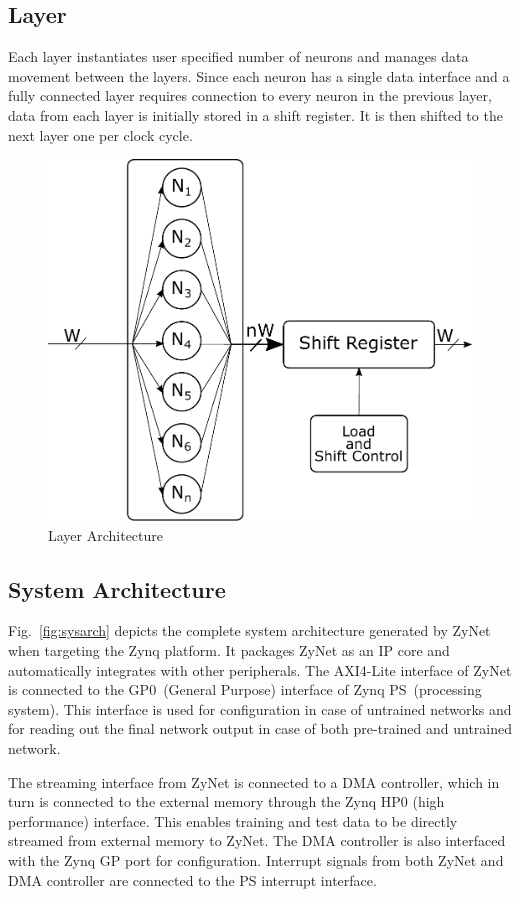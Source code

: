 \subsection{Layer}
Each layer instantiates user specified number of neurons and manages data movement between the layers.
Since each neuron has a single data interface and a fully connected layer requires connection to every neuron in the previous layer, data from each layer is initially stored in a shift register.
It is then shifted to the next layer one per clock cycle.
\begin{figure}[!t]
\centering
   \includegraphics[width=0.8\columnwidth]{Figures/layer.pdf}
   \caption{Layer Architecture}
   \label{fig:arch}
   \vspace{-3mm}
\end{figure}

\subsection{System Architecture}
Fig.~\ref{fig:sysarch} depicts the complete system architecture generated by ZyNet when targeting the Zynq platform.
It packages ZyNet as an IP core and automatically integrates with other peripherals.
The AXI4-Lite interface of ZyNet is connected to the GP0~(General Purpose) interface of Zynq PS~(processing system).
This interface is used for configuration in case of untrained networks and for reading out the final network output in case of both pre-trained and untrained network.

The streaming interface from ZyNet is connected to a DMA controller, which in turn is connected to the external memory through the Zynq HP0 (high performance) interface.
This enables training and test data to be directly streamed from external memory to ZyNet.
The DMA controller is also interfaced with the Zynq GP port for configuration.
Interrupt signals from both ZyNet and DMA controller are connected to the PS interrupt interface.
 
